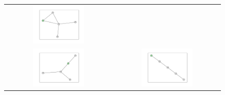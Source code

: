 \documentclass[12pt, a4paper]{extarticle}
\begin{document}
\begin{figure}
\begin{tabularx}{\textwidth}{cc}
\includegraphics[width=0.5\textwidth]{task11-graphlets/5_16-25-23-24-26.pdf} \\
\includegraphics[width=0.5\textwidth]{task11-graphlets/5_16-18-19-23-24.pdf} &
\includegraphics[width=0.5\textwidth]{task11-graphlets/5_10-11-16-25-23.pdf} \\
\end{tabularx}\end{figure}
\end{document}

